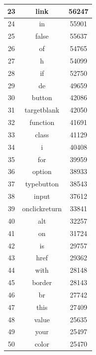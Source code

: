 \begin{enumerate}
\begin{table}
\begin{center}
\begin{tabular}{ c | c | c }
23 & link & 56247 \\ \hline
24 & in & 55901 \\ \hline
25 & false & 55637 \\ \hline
26 & of & 54765 \\ \hline
27 & h & 54099 \\ \hline
28 & if & 52750 \\ \hline
29 & de & 49659 \\ \hline
30 & button & 42086 \\ \hline
31 & targetblank & 42050 \\ \hline
32 & function & 41691 \\ \hline
33 & class & 41129 \\ \hline
34 & i & 40408 \\ \hline
35 & for & 39959 \\ \hline
36 & option & 38933 \\ \hline
37 & typebutton & 38543 \\ \hline
38 & input & 37612 \\ \hline
39 & onclickreturn & 33841 \\ \hline
40 & alt & 32257 \\ \hline
41 & on & 31724 \\ \hline
42 & is & 29757 \\ \hline
43 & href & 29362 \\ \hline
44 & with & 28148 \\ \hline
45 & border & 28143 \\ \hline
46 & br & 27742 \\ \hline
47 & this & 27409 \\ \hline
48 & value & 25635 \\ \hline
49 & your & 25497 \\ \hline
50 & color & 25470 \\ \hline
				\end{tabular}
			\end{center}  
	\end{table}  
	

\end{enumerate}

